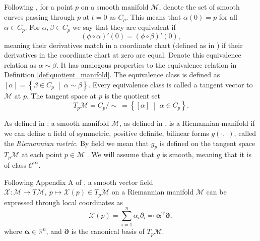 \begin{definition}\label{def:tangent_space}
    Following \cite[Def.~8.33]{Boumal2023}, for a point $p$ on a smooth manifold $\mathcal{M}$, denote the set of smooth curves \cite[Def.~8.5]{Boumal2023} passing through $p$ at $t=0$ as $C_{p}$. This means that $\alpha(0)=p$ for all $\alpha\in C_{p}$. For $\alpha, \beta\in C_{p}$ we say that they are equivalent if 
    \begin{equation*}
        (\phi\circ \alpha)'(0)=(\phi\circ \beta)'(0),
    \end{equation*}
    meaning their derivatives match in a \textup{coordinate chart} (defined as in \cite[p.~4]{Lee2012:1}) if their derivatives in the coordinate chart at zero are equal. Denote this equivalence relation as $\alpha\sim \beta$. It has analogous properties to the equivalence relation in Definition \ref{def:quotient_manifold}. The equivalence class is defined as $[\alpha]=\left\{\beta\in C_{p} \;\middle|\; \alpha\sim \beta\right\}$. Every equivalence class is called a \textup{tangent vector} to $\mathcal{M}$ at $p$. The \textup{tangent space} at $p$ is the quotient set
    \begin{equation*}
        T_{p}\mathcal{M}=C_{p}/\sim~=\left\{[\alpha] \;\middle|\; \alpha\in C_{p}\right\}.
    \end{equation*}  
\end{definition}

\begin{definition}\label{def:riemannian_manifold}
    As defined in \cite[def~2.6,~p.~179]{Boothby1975}: a \textup{smooth manifold} $\mathcal{M}$, as defined in \cite[p.~13]{Lee2012:1},  is a \textup{Riemannian manifold} if we can define a field of symmetric, positive definite, bilinear forms $g(\cdot,\cdot)$, called the \textit{Riemannian metric}. By field we mean that $g_p$ is defined on the tangent space $T_p\mathcal{M}$ at each point $p\in \mathcal{M}$ \cite[def~2.1,~p.~178]{Boothby1975}. We will assume that $g$ is smooth, meaning that it is of class $\mathcal{C}^\infty$.
\end{definition}


\begin{definition}\label{def:vector_field_on_manifold}
    Following Appendix A of \cite{JensenZimmermann2024}, a smooth vector field $\mathcal{X}\colon \mathcal{M}\xrightarrow{}T \mathcal{M},~p\mapsto \mathcal{X}(p)\in T_{p}\mathcal{M}$ on a Riemannian manifold $\mathcal{M}$ can be expressed through local coordinates as 
    \begin{equation*}
        \mathcal{X}(p)=\sum\limits_{i=1}^{n}\alpha_{i}\partial_{i}\eqqcolon \mathbf{\alpha}^{\mathrm{T}}\mathbf{\partial},
    \end{equation*}
    where $\mathbf{\alpha}\in \mathbb{R}^{n}$, and $\mathbf{\partial}$ is the canonical basis of $T_{p}\mathcal{M}$.
    
\end{definition}

